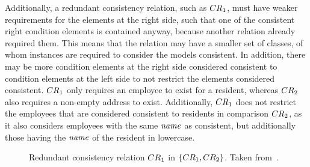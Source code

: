 \begin{example}
Additionally, a redundant consistency relation, such as $\consistencyrelation{CR}{1}$, must have weaker requirements for the  elements at the right side, such that one of the consistent right condition elements is contained anyway, because another relation already required them. 
This means that the relation may have a smaller set of classes, of whom instances are required to consider the models consistent.
In addition, there may be more condition elements at the right side considered consistent to condition elements at the left side to not restrict the elements considered consistent.
$\consistencyrelation{CR}{1}$ only requires an employee to exist for a resident, whereas $\consistencyrelation{CR}{2}$ also requires a non-empty address to exist. Additionally, $\consistencyrelation{CR}{1}$ does not restrict the employees that are considered consistent to residents in comparison $\consistencyrelation{CR}{2}$, as it also considers employees with the same $\mathit{name}$ as consistent, but additionally those having the $\mathit{name}$ of the resident in lowercase.
\end{example}

\begin{figure}
    \centering
    
    \caption[Redundant consistency relation]{Redundant consistency relation $\consistencyrelation{CR}{1}$ in $\setted{\consistencyrelation{CR}{1}, \consistencyrelation{CR}{2}}$. Taken from~.}
    \label{fig:compatibility:redundancyrelationextremes}
\end{figure}


